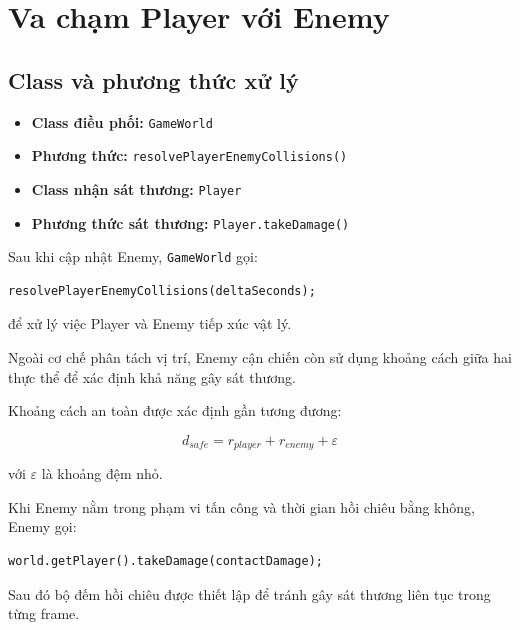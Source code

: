 \documentclass[12pt,a4paper]{report}
\begin{document}
    \section{Va chạm Player với Enemy}

    \subsection{Class và phương thức xử lý}

    \begin{itemize}
        \item \textbf{Class điều phối:} \texttt{GameWorld}
        \item \textbf{Phương thức:}
        \texttt{resolvePlayerEnemyCollisions()}
        \item \textbf{Class nhận sát thương:} \texttt{Player}
        \item \textbf{Phương thức sát thương:}
        \texttt{Player.takeDamage()}
    \end{itemize}

    Sau khi cập nhật Enemy, \texttt{GameWorld} gọi:

    \begin{verbatim}
resolvePlayerEnemyCollisions(deltaSeconds);
    \end{verbatim}

    để xử lý việc Player và Enemy tiếp xúc vật lý.

    Ngoài cơ chế phân tách vị trí, Enemy cận chiến còn sử dụng khoảng
    cách giữa hai thực thể để xác định khả năng gây sát thương.

    Khoảng cách an toàn được xác định gần tương đương:

    \[
        d_{safe}
        =
        r_{player}+r_{enemy}+\varepsilon
    \]

    với $\varepsilon$ là khoảng đệm nhỏ.

    Khi Enemy nằm trong phạm vi tấn công và thời gian hồi chiêu bằng
    không, Enemy gọi:

    \begin{verbatim}
world.getPlayer().takeDamage(contactDamage);
    \end{verbatim}

    Sau đó bộ đếm hồi chiêu được thiết lập để tránh gây sát thương
    liên tục trong từng frame.


\end{document}
